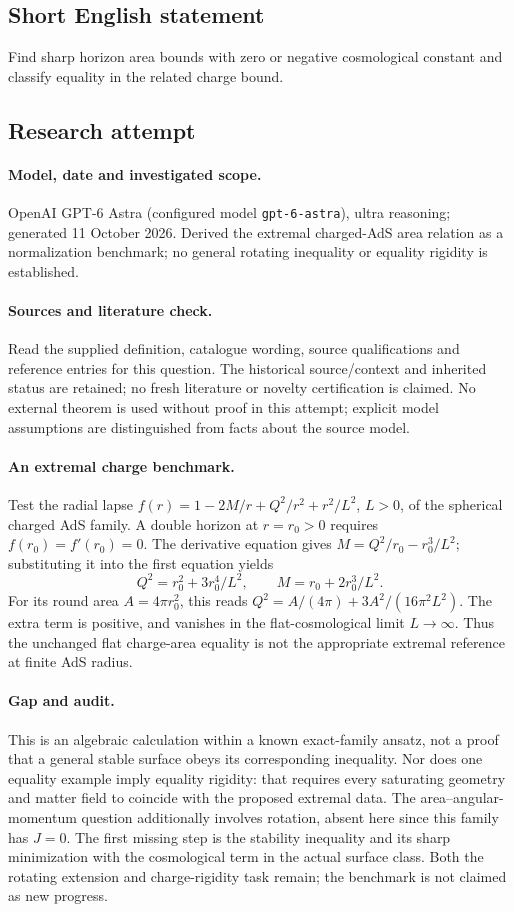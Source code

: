 \documentclass[11pt]{article}
\begin{document}
\subsection{Short English statement}
Find sharp horizon area bounds with zero or negative cosmological constant and classify equality in the related charge bound.
\subsection{Research attempt}
\paragraph{Model, date and investigated scope.}
OpenAI GPT-6 Astra (configured model \texttt{gpt-6-astra}), ultra reasoning; generated 11 October 2026. Derived the extremal charged-AdS area relation as a normalization benchmark; no general rotating inequality or equality rigidity is established.

\paragraph{Sources and literature check.}
Read the supplied definition, catalogue wording, source qualifications and reference entries for this question. The historical source/context and inherited status are retained; no fresh literature or novelty certification is claimed. No external theorem is used without proof in this attempt; explicit model assumptions are distinguished from facts about the source model.

\paragraph{An extremal charge benchmark.} Test the radial lapse \(f(r)=1-2M/r+Q^2/r^2+r^2/L^2\), \(L>0\), of the spherical charged AdS family. A double horizon at \(r=r_0>0\) requires \(f(r_0)=f'(r_0)=0\). The derivative equation gives \(M=Q^2/r_0-r_0^3/L^2\); substituting it into the first equation yields
\[
 Q^2=r_0^2+3r_0^4/L^2,\qquad M=r_0+2r_0^3/L^2.
\]
For its round area \(A=4\pi r_0^2\), this reads \(Q^2=A/(4\pi)+3A^2/(16\pi^2L^2)\). The extra term is positive, and vanishes in the flat-cosmological limit \(L\to\infty\). Thus the unchanged flat charge-area equality is not the appropriate extremal reference at finite AdS radius.
\paragraph{Gap and audit.} This is an algebraic calculation within a known exact-family ansatz, not a proof that a general stable surface obeys its corresponding inequality. Nor does one equality example imply equality rigidity: that requires every saturating geometry and matter field to coincide with the proposed extremal data. The area--angular-momentum question additionally involves rotation, absent here since this family has \(J=0\). The first missing step is the stability inequality and its sharp minimization with the cosmological term in the actual surface class. Both the rotating extension and charge-rigidity task remain; the benchmark is not claimed as new progress.
\end{document}
